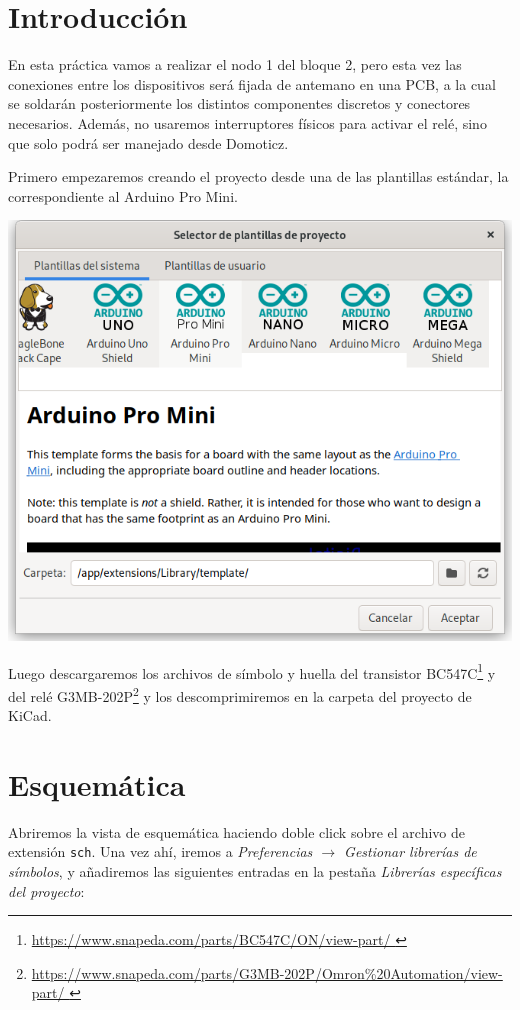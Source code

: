 \section{Introducción}

En esta práctica vamos a realizar el nodo 1 del bloque 2, pero esta vez las
conexiones entre los dispositivos será fijada de antemano en una PCB, a la cual
se soldarán posteriormente los distintos componentes discretos y conectores
necesarios. Además, no usaremos interruptores físicos para activar el relé,
sino que solo podrá ser manejado desde Domoticz.

Primero empezaremos creando el proyecto desde una de las plantillas estándar,
la correspondiente al Arduino Pro Mini.

\includegraphics[width=\linewidth]{create-project-template.png}

Luego descargaremos los archivos de símbolo y huella del transistor
BC547C\footnote{\url{
    https://www.snapeda.com/parts/BC547C/ON/view-part/
}} y del relé G3MB-202P\footnote{\url{
    https://www.snapeda.com/parts/G3MB-202P/Omron\%20Automation/view-part/
}} y los descomprimiremos en la carpeta del proyecto de KiCad.

\section{Esquemática}

Abriremos la vista de esquemática haciendo doble click sobre el archivo de
extensión \verb|sch|. Una vez ahí, iremos a
\emph{Preferencias $\rightarrow$ Gestionar librerías de símbolos}, y añadiremos
las siguientes entradas en la pestaña
\emph{Librerías específicas del proyecto}:

